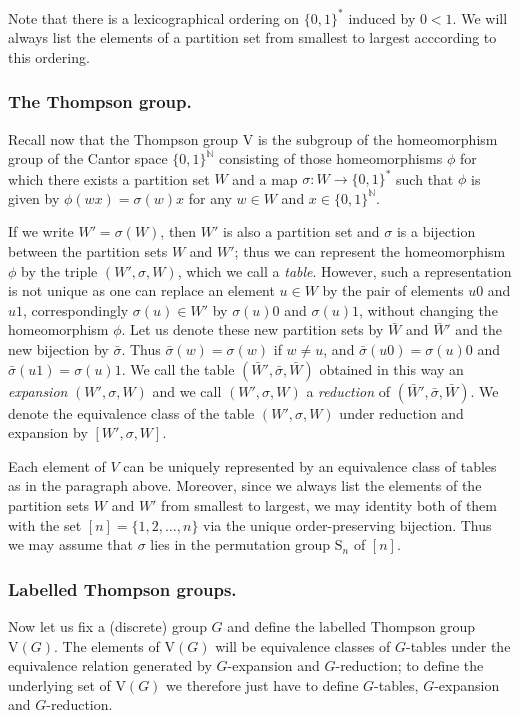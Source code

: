 \documentclass[10pt,a4paper]{amsart}
\numberwithin{equation}{section}
\numberwithin{figure}{section}
\theoremstyle{definition}
\newcommand{\bN}{\mathbb{N}}
\newcommand{\V}{\mathrm{V}}
\begin{document}
Note that there is a lexicographical ordering on $\{0,1\}^*$ induced by $0<1$. We will always list the elements of a partition set from smallest to largest acccording to this ordering.

\subsubsection*{The Thompson group.}
Recall now that the Thompson group $\V$ is the subgroup of the homeomorphism group of the Cantor space $\{0,1\}^\bN$ consisting of those homeomorphisms $\phi$ for which there exists a partition set $W$ and a map $\sigma \colon W \to \{0,1\}^*$ such that $\phi$ is given by $\phi(wx) = \sigma(w)x$ for any $w\in W$ and $x\in \{0,1\}^{\bN}$.

If we write $W' = \sigma(W)$, then $W'$ is also a partition set and $\sigma$ is a bijection between the partition sets $W$ and $W'$; thus we can represent the homeomorphism $\phi$ by the triple $(W',\sigma,W)$, which we call a \emph{table}. However, such a representation is not unique as one can replace an element $u\in W$ by the pair of elements $u0$ and $u1$, correspondingly $\sigma(u) \in W'$ by $\sigma(u)0$ and $\sigma(u)1$, without changing the homeomorphism $\phi$. Let us denote these new partition sets by $\bar{W}$ and $\bar{W}'$ and the new bijection by $\bar{\sigma}$. Thus $\bar{\sigma}(w) = \sigma(w)$ if $w \neq u$, and $\bar{\sigma}(u0) = \sigma(u)0$ and $\bar{\sigma}(u1) = \sigma(u)1$. We call the table $(\bar{W}',\bar{\sigma},\bar{W})$ obtained in this way an \emph{expansion} $(W',\sigma, W)$ and we call $(W',\sigma, W)$ a \emph{reduction} of $(\bar{W}',\bar{\sigma},\bar{W})$. We denote the equivalence class of the table $(W',\sigma, W)$ under reduction and expansion by $[W',\sigma,W]$.

Each element of $V$ can be uniquely represented by an equivalence class of tables as in the paragraph above. Moreover, since we always list the elements of the partition sets $W$ and $W'$ from smallest to largest, we may identity both of them with the set $[n]= \{1,2,\ldots,n\}$ via the unique order-preserving bijection. Thus we may assume that $\sigma$ lies in the permutation group $\mathrm{S}_n$ of $[n]$.


\subsubsection*{Labelled Thompson groups.}
Now let us fix a (discrete) group $G$ and define the labelled Thompson group $\V(G)$. The elements of $\V(G)$ will be equivalence classes of $G$-tables under the equivalence relation generated by $G$-expansion and $G$-reduction; to define the underlying set of $\V(G)$ we therefore just have to define $G$-tables, $G$-expansion and $G$-reduction.
\end{document}
